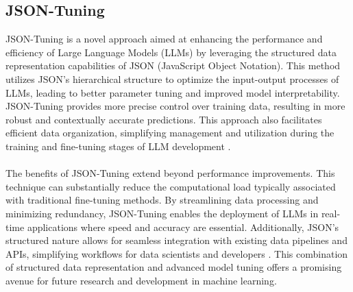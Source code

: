 \subsection*{JSON-Tuning}
JSON-Tuning is a novel approach aimed at enhancing the performance and efficiency of Large Language Models (LLMs) by leveraging the structured data representation capabilities of JSON (JavaScript Object Notation). This method utilizes JSON's hierarchical structure to optimize the input-output processes of LLMs, leading to better parameter tuning and improved model interpretability. JSON-Tuning provides more precise control over training data, resulting in more robust and contextually accurate predictions. This approach also facilitates efficient data organization, simplifying management and utilization during the training and fine-tuning stages of LLM development \cite{zheng2024llamafactory}.
\\\\
The benefits of JSON-Tuning extend beyond performance improvements. This technique can substantially reduce the computational load typically associated with traditional fine-tuning methods. By streamlining data processing and minimizing redundancy, JSON-Tuning enables the deployment of LLMs in real-time applications where speed and accuracy are essential. Additionally, JSON's structured nature allows for seamless integration with existing data pipelines and APIs, simplifying workflows for data scientists and developers \cite{zhu2024lift}. This combination of structured data representation and advanced model tuning offers a promising avenue for future research and development in machine learning.

